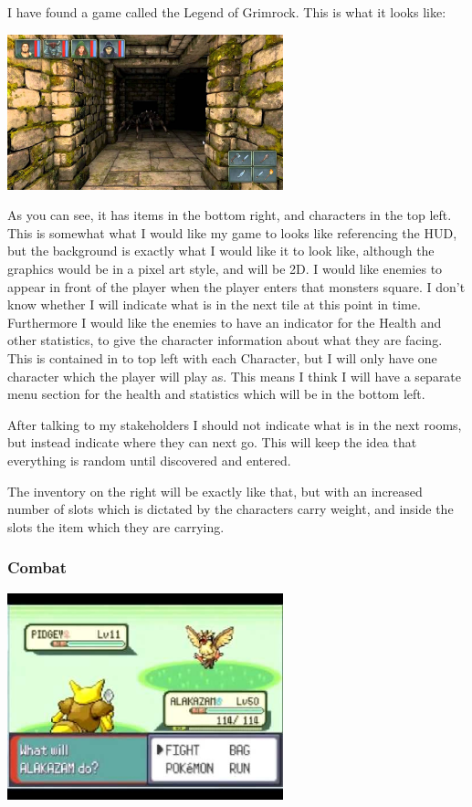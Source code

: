 \documentclass[12pt]{article}
\begin{document}
I have found a game called the Legend of Grimrock. This is what it looks like:

\includegraphics[width = 0.6\textwidth]{Grimlock_Image}

As you can see, it has items in the bottom right, and characters in the top left. This is somewhat what I would like my game to looks like referencing the HUD, but the background is exactly what I would like it to look like, although the graphics would be in a pixel art style, and will be 2D. I would like enemies to appear in front of the player when the player enters that monsters square. I don't know whether I will indicate what is in the next tile at this point in time. Furthermore I would like the enemies to have an indicator for the Health and other statistics, to give the character information about what they are facing. This is contained in to top left with each Character, but I will only have one character which the player will play as. This means I think I will have a separate menu section for the health and statistics which will be in the bottom left. 

After talking to my stakeholders I should not indicate what is in the next rooms, but instead indicate where they can next go. This will keep the idea that everything is random until discovered and entered.

The inventory on the right will be exactly like that, but with an increased number of slots which is dictated by the characters carry weight, and inside the slots the item which they are carrying.

	
			\subsubsection{Combat}

\includegraphics[width = 0.6\textwidth]{Pokemon_Image}
\end{document}
